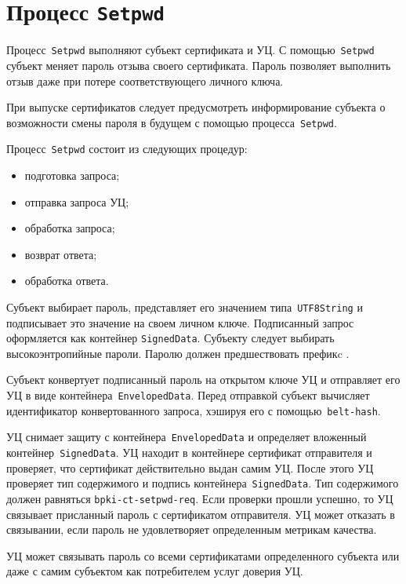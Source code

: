 \section{Процесс \texttt{Setpwd}}\label{PROCESSES.Setpwd}

Процесс~\texttt{Setpwd} выполняют субъект сертификата и УЦ.
С помощью~\texttt{Setpwd} субъект меняет пароль отзыва своего 
сертификата. Пароль позволяет выполнить отзыв даже при потере 
соответствующего личного ключа.

При выпуске сертификатов следует предусмотреть информирование субъекта 
о возможности смены пароля в будущем с помощью процесса~\texttt{Setpwd}.

Процесс~\texttt{Setpwd} состоит из следующих процедур:
\begin{itemize}
\item
подготовка запроса;
\item
отправка запроса УЦ;
\item
обработка запроса;
\item
возврат ответа;
\item
обработка ответа.
\end{itemize}

Субъект выбирает пароль, представляет его значением типа~\texttt{UTF8String}
и подписывает это значение на своем личном ключе.
Подписанный запрос оформляется как контейнер \texttt{SignedData}.
%
Субъекту следует выбирать высокоэнтропийные пароли. 
Паролю должен предшествовать префикc .

Субъект конвертует подписанный пароль на открытом ключе УЦ
и отправляет его УЦ в виде контейнера~\texttt{EnvelopedData}.
Перед отправкой субъект вычисляет идентификатор конвертованного запроса,
хэшируя его с помощью~\texttt{belt-hash}.

УЦ снимает защиту с контейнера~\texttt{EnvelopedData} и определяет 
вложенный контейнер~\texttt{SignedData}. УЦ находит в контейнере
сертификат отправителя и проверяет, что сертификат действительно 
выдан самим УЦ. После этого УЦ проверяет тип содержимого и подпись 
контейнера~\texttt{SignedData}. Тип содержимого должен равняться
\texttt{bpki-ct-setpwd-req}. Если проверки прошли успешно, то УЦ  
связывает присланный пароль с сертификатом отправителя. УЦ может отказать 
в связывании, если пароль не удовлетворяет определенным метрикам качества.

\begin{note*}
УЦ может связывать пароль со всеми сертификатами определенного субъекта или даже
с самим субъектом как потребителем услуг доверия УЦ.
\end{note*}

